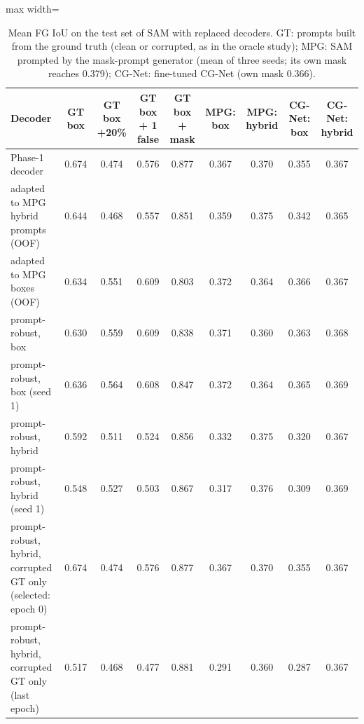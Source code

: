 \begin{table}[htbp]
\centering
\small
\begin{adjustbox}{max width=\linewidth}
\begin{tabular}{lcccccccc}
\toprule
Decoder & GT box & GT box +20\% & GT box + 1 false & GT box + mask & MPG: box & MPG: hybrid & CG-Net: box & CG-Net: hybrid \\
\midrule
Phase-1 decoder & 0.674 & 0.474 & 0.576 & 0.877 & 0.367 & 0.370 & 0.355 & 0.367 \\
adapted to MPG hybrid prompts (OOF) & 0.644 & 0.468 & 0.557 & 0.851 & 0.359 & 0.375 & 0.342 & 0.365 \\
adapted to MPG boxes (OOF) & 0.634 & 0.551 & 0.609 & 0.803 & 0.372 & 0.364 & 0.366 & 0.367 \\
prompt-robust, box & 0.630 & 0.559 & 0.609 & 0.838 & 0.371 & 0.360 & 0.363 & 0.368 \\
prompt-robust, box (seed 1) & 0.636 & 0.564 & 0.608 & 0.847 & 0.372 & 0.364 & 0.365 & 0.369 \\
prompt-robust, hybrid & 0.592 & 0.511 & 0.524 & 0.856 & 0.332 & 0.375 & 0.320 & 0.367 \\
prompt-robust, hybrid (seed 1) & 0.548 & 0.527 & 0.503 & 0.867 & 0.317 & 0.376 & 0.309 & 0.369 \\
prompt-robust, hybrid, corrupted GT only (selected: epoch 0) & 0.674 & 0.474 & 0.576 & 0.877 & 0.367 & 0.370 & 0.355 & 0.367 \\
prompt-robust, hybrid, corrupted GT only (last epoch) & 0.517 & 0.468 & 0.477 & 0.881 & 0.291 & 0.360 & 0.287 & 0.367 \\
\bottomrule
\end{tabular}
\end{adjustbox}
\caption{Mean FG IoU on the test set of SAM with replaced decoders. GT: prompts built from the ground truth (clean or corrupted, as in the oracle study); MPG: SAM prompted by the mask-prompt generator (mean of three seeds; its own mask reaches 0.379); CG-Net: fine-tuned CG-Net (own mask 0.366).}
\label{tab:robust_decoder_infused_mlp1}
\end{table}
